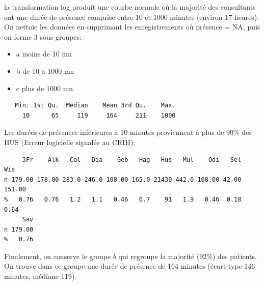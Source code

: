 \documentclass[12pt,english,french,twoside]{book}\usepackage[]{graphicx}\usepackage[]{color}
\makeatletter
\newenvironment{kframe}{%
 \def\at@end@of@kframe{}%
 \ifinner\ifhmode%
  \def\at@end@of@kframe{\end{minipage}}%
  \begin{minipage}{\columnwidth}%
 \fi\fi%
 \def\FrameCommand##1{\hskip\@totalleftmargin \hskip-\fboxsep
 \colorbox{shadecolor}{##1}\hskip-\fboxsep
     \hskip-\linewidth \hskip-\@totalleftmargin \hskip\columnwidth}%
 \MakeFramed {\advance\hsize-\width
   \@totalleftmargin\z@ \linewidth\hsize
   \@setminipage}}%
 {\par\unskip\endMakeFramed%
 \at@end@of@kframe}
\newenvironment{knitrout}{}{} %
\makeatother
\begin{document}
la transformation log produit une courbe normale où la majorité des consultants ont une durée de présence comprise entre 10 et 1000 minutes (environ 17 heures). On nettoie les données en supprimant les enregistrements où présence = NA, puis on forme 3 sous-groupes:
\begin{itemize}
  \item a moins de 10 mn
  \item b de 10 à 1000 mn
  \item c plus de 1000 mn
\end{itemize}

\begin{knitrout}
\color{fgcolor}\begin{kframe}
\begin{verbatim}
   Min. 1st Qu.  Median    Mean 3rd Qu.    Max. 
     10      65     119     164     211    1000 
\end{verbatim}
\end{kframe}
\end{knitrout}


Les durées de présences inférieures à 10 minutes proviennent à plus de 90\% des HUS (Erreur logicielle signalée au CRIH):
\begin{knitrout}
\color{fgcolor}\begin{kframe}
\begin{verbatim}
     3Fr    Alk   Col   Dia    Geb   Hag   Hus   Mul    Odi   Sel    Wis
n 179.00 178.00 283.0 246.0 108.00 165.0 21430 442.0 108.00 42.00 151.00
%   0.76   0.76   1.2   1.1   0.46   0.7    91   1.9   0.46  0.18   0.64
     Sav
n 179.00
%   0.76
\end{verbatim}
\end{kframe}
\end{knitrout}


Finalement, on conserve le groupe $b$ qui regroupe la majorité (92\%) des patients. On trouve dans ce groupe une durée de présence de 164 minutes (écart-type 146 minutes, médiane 119).
\end{document}
